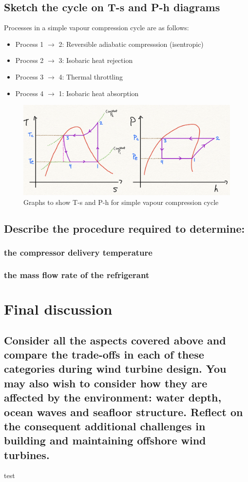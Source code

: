 \documentclass[12pt]{article}
\numberwithin{equation}{section}
\begin{document}
\begin{flushleft}
\subsection{Sketch the cycle on T-s and P-h diagrams}
Processes in a simple vapour compression cycle are as follows:
\begin{itemize}
  \item Process 1 $\rightarrow$ 2: Reversible adiabatic compresssion (isentropic)
  \item Process 2 $\rightarrow$ 3: Isobaric heat rejection
  \item Process 3 $\rightarrow$ 4: Thermal throttling
  \item Process 4 $\rightarrow$ 1: Isobaric heat absorption
\end{itemize}
\begin{figure}[H]
  \centering
  \includegraphics[width  = \textwidth]{./img/TsPhDiagrams64.png}
  \caption{Graphs to show T-s and P-h for simple vapour compression cycle}
\end{figure}
\subsection{Describe the procedure required to determine:}
\subsubsection{the compressor delivery temperature}
\subsubsection{the mass flow rate of the refrigerant}

\section{Final discussion}
\subsection{Consider all the aspects covered above and compare the trade-offs in each of these categories during wind turbine design. You may also wish to consider how they are affected by the environment: water depth, ocean waves and seafloor structure. Reflect on the consequent additional challenges in building and maintaining offshore wind turbines.}
test


\end{flushleft}
\end{document}
